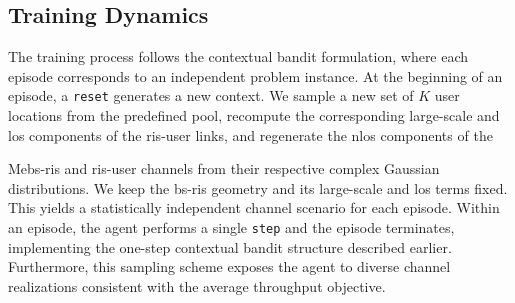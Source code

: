 \documentclass[letterpaper,journal]{IEEEtran}
\begin{document}
\subsection{Training Dynamics}
\label{sec:training_dynamics}
The training process follows the contextual bandit formulation, where each episode corresponds to an independent problem instance. At the beginning of an episode, a \texttt{reset} generates a new context. We sample a new set of $K$ user locations from the predefined pool, recompute the corresponding large-scale and \gls{los} components of the \gls{ris}-user links, and regenerate the \gls{nlos} components of the 

Me\gls{bs}-\gls{ris} and \gls{ris}-user channels from their respective complex Gaussian distributions. We keep the \gls{bs}-\gls{ris} geometry and its large-scale and \gls{los} terms fixed. This yields a statistically independent channel scenario for each episode. Within an episode, the agent performs a single \texttt{step} and the episode terminates, implementing the one-step contextual bandit structure described earlier. Furthermore, this sampling scheme exposes the agent to diverse channel realizations consistent with the average throughput objective.
\end{document}
